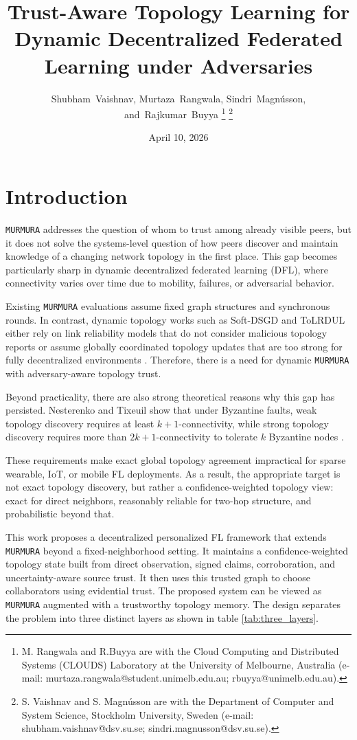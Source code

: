 \documentclass[journal]{IEEEtran}
\title{Trust-Aware Topology Learning for Dynamic Decentralized Federated Learning under Adversaries}
\author{Shubham~Vaishnav, Murtaza~Rangwala, Sindri~Magnússon, and~Rajkumar~Buyya
\thanks{M. Rangwala and R.Buyya are with the Cloud Computing and Distributed Systems (CLOUDS) Laboratory at the University of Melbourne, Australia (e-mail: murtaza.rangwala@student.unimelb.edu.au; rbuyya@unimelb.edu.au).}
\thanks{S. Vaishnav and S. Magn\'usson are with the Department of Computer and System Science, Stockholm University, Sweden (e-mail: shubham.vaishnav@dsv.su.se; sindri.magnusson@dsv.su.se).}
}
\date{April 10, 2026}
\theoremstyle{definition}
\theoremstyle{remark}
\begin{document}
\maketitle


\section{Introduction}

\texttt{MURMURA} \cite{rangwala2025evidential} addresses the question of whom to trust among already visible peers, but it does not solve the  systems-level question of how peers discover and maintain knowledge of a changing network topology in the first place. This gap becomes particularly sharp in dynamic decentralized federated learning (DFL), where connectivity varies over time due to mobility, failures, or adversarial behavior.

Existing \texttt{MURMURA} evaluations assume fixed graph structures and synchronous rounds. In contrast, dynamic topology works such as Soft-DSGD and ToLRDUL either rely on link reliability models that do not consider malicious topology reports or assume globally coordinated topology updates that are too strong for fully decentralized environments \cite{rangwala2025evidential,ye2022decentralized,wu2024topology}. Therefore, there is a need for dynamic \texttt{MURMURA} with adversary-aware topology trust.

Beyond practicality, there are also strong theoretical reasons why this gap has persisted. Nesterenko and Tixeuil show that under Byzantine faults, weak topology discovery requires at least
$k+1$-connectivity, while strong topology discovery requires more than $2k+1$-connectivity to tolerate
$k$ Byzantine nodes \cite{nesterenko2009discovering}.

These requirements make exact global topology agreement impractical for sparse wearable, IoT, or mobile FL deployments. As a result, the appropriate target is not exact topology discovery, but rather a confidence-weighted topology view: exact for direct neighbors, reasonably reliable for two-hop structure, and probabilistic beyond that.

This work proposes a decentralized personalized FL framework that extends \texttt{MURMURA} beyond a fixed-neighborhood setting. It maintains a confidence-weighted topology state built from direct observation, signed claims, corroboration, and uncertainty-aware source trust. It then uses this trusted graph to choose collaborators using evidential trust. The proposed system can be viewed as \texttt{MURMURA} augmented with a trustworthy topology memory. The design separates the problem into three distinct layers as shown in table \ref{tab:three_layers}.
\end{document}
